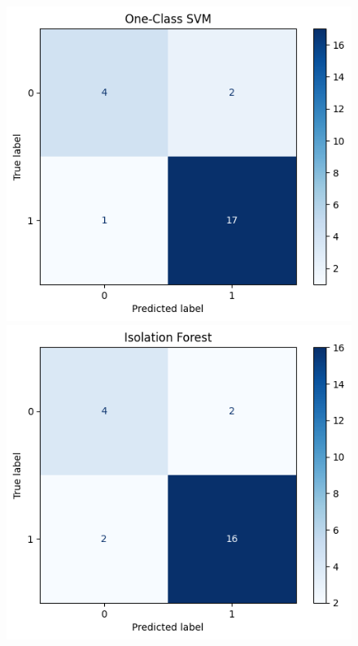 \documentclass[12pt,a4paper]{article}
\numberwithin{figure}{section}
\numberwithin{table}{section}
\numberwithin{definition}{section}
\begin{document}
\begin{figure}[!h]
  \centering
  \begin{minipage}{0.5\textwidth}
    \includegraphics[width=\textwidth]{CM_ocsvm.png}
  \end{minipage}\hfill
  \begin{minipage}{0.5\textwidth}
    \includegraphics[width=\textwidth]{CM_if.png}

\end{minipage}
\end{figure}
\end{document}
